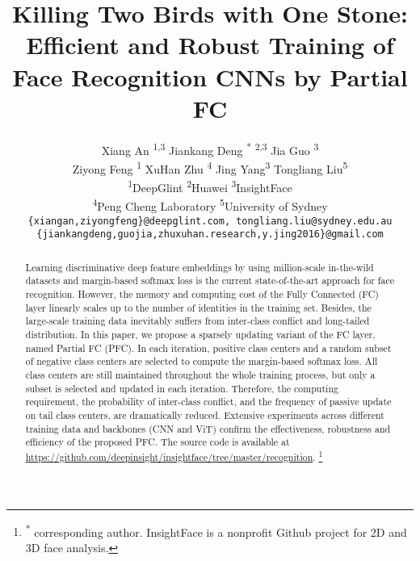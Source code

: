 \documentclass[10pt,twocolumn,letterpaper]{article}
\newcommand*{\affaddr}[1]{#1}
\newcommand*{\affmark}[1][*]{\textsuperscript{#1}}
\renewcommand\thefootnote{}
\begin{document}
\title{Killing Two Birds with One Stone: \\
Efficient and Robust Training of Face Recognition CNNs by Partial FC}

\author{
Xiang An \affmark[1,3] \qquad Jiankang Deng \textsuperscript{*} \affmark[2,3] \qquad Jia Guo \affmark[3] \\ \qquad Ziyong Feng \affmark[1] \qquad XuHan Zhu \affmark[4] \qquad Jing Yang\affmark[3]  \qquad Tongliang Liu\affmark[5]\\
\affaddr{\affmark[1]DeepGlint} \qquad
\affaddr{\affmark[2]Huawei} \qquad
\affaddr{\affmark[3]InsightFace} \qquad \\
\affaddr{\affmark[4]Peng Cheng Laboratory}\qquad 
\affaddr{\affmark[5]University of Sydney}\\
{\tt\small \{xiangan,ziyongfeng\}@deepglint.com,  tongliang.liu@sydney.edu.au} \\
{\tt\small \{jiankangdeng,guojia,zhuxuhan.research,y.jing2016\}@gmail.com}
}

\maketitle

\begin{abstract}
Learning discriminative deep feature embeddings by using million-scale in-the-wild datasets and margin-based softmax loss is the current state-of-the-art approach for face recognition. However, the memory and computing cost of the Fully Connected (FC) layer linearly scales up to the number of identities in the training set. Besides, the large-scale training data inevitably suffers from inter-class conflict and long-tailed distribution. In this paper, we propose a sparsely updating variant of the FC layer, named Partial FC (PFC). In each iteration, positive class centers and a random subset of negative class centers are selected to compute the margin-based softmax loss. All class centers are still maintained throughout the whole training process, but only a subset is selected and updated in each iteration. Therefore, the computing requirement, the probability of inter-class conflict, and the frequency of passive update on tail class centers, are dramatically reduced. Extensive experiments 
across different training data and backbones (\eg CNN and ViT) confirm the effectiveness, robustness and efficiency of the proposed PFC. 
The source code is available at \url{https://github.com/deepinsight/insightface/tree/master/recognition}.
\footnote{\textsuperscript{*} corresponding author. InsightFace is a nonprofit Github project for 2D and 3D face analysis.} 
\setcounter{footnote}{0}
\renewcommand\thefootnote{\arabic{footnote}}
\end{abstract}
\end{document}
